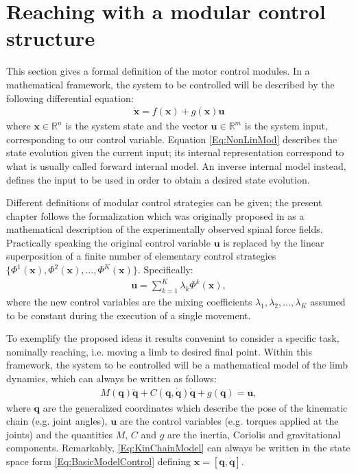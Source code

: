 \documentclass{svmult}
\begin{document}
\section{Reaching with a modular control structure} \label{Sec:SimpleReach}

This section gives a formal definition of the motor
control modules. In a mathematical framework, the system
to be controlled will be described by the following differential 
equation:
\begin{eqnarray} \label{Eq:NonLinMod}
\mathbf {\dot x} = f (\mathbf x) + g(\mathbf x) \mathbf u
\end{eqnarray}
where $\mathbf x \in \mathbb R^n$ is the system state and 
the vector $\mathbf u  \in \mathbb R^m$ is the system input,
corresponding to our control variable. Equation \eqref{Eq:NonLinMod}
describes the state evolution given the current input;
its internal representation correspond to what is usually called
forward internal model. An inverse internal model instead, 
defines the input to be used in order to obtain a desired state evolution. 

Different definitions of modular control strategies can be given; 
the present chapter follows the formalization which was originally proposed 
in \cite{BizziMussa-Ivaldi} as a mathematical description of 
the experimentally observed spinal force fields. Practically 
speaking the original control variable $\mathbf u$ is replaced 
by the linear superposition of a finite number of elementary control strategies 
$\{ \Phi^1(\mathbf x), \Phi^2(\mathbf x), \dots, \Phi^K(\mathbf x)\}$. Specifically:
\begin{eqnarray} \label{Eq:BasicModelControl}
\mathbf u = \sum_{k=1}^K \lambda_k \Phi^k(\mathbf x),
\end{eqnarray}
where the new control variables are the mixing coefficients 
$\lambda_1, \lambda_2, \dots, \lambda_K$ assumed to be 
constant during the execution of a single movement. 

To exemplify the proposed ideas it results convenint to consider a specific
 task, nominally reaching, i.e. moving a limb to desired final point. Within 
this framework, the system to be controlled will be a mathematical 
model of the limb dynamics, which can always
be written as follows:
\begin{eqnarray} \label{Eq:KinChainModel}
M(\mathbf{q}) \ddot{\mathbf{q}} +
C(\mathbf{q},\dot{\mathbf{q}})\dot{\mathbf{q}} + g(\mathbf{q}) =
\mathbf{u},
\end{eqnarray}
where $\mathbf{q}$ are the generalized coordinates which describe
the pose of the kinematic chain (e.g. joint angles), $\mathbf{u}$ are the control
variables (e.g. torques applied at the joints) and the
quantities $M$, $C$ and  $g$ are the inertia, Coriolis and
gravitational components. Remarkably, \eqref{Eq:KinChainModel}
can always be written in the state space form 
\eqref{Eq:BasicModelControl} defining $\mathbf x = [\mathbf q, 
\dot{\mathbf q}]$.
 
\end{document}
